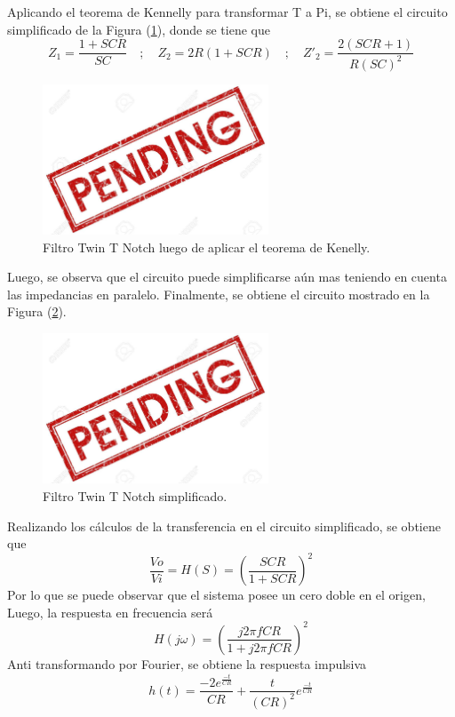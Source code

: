 \documentclass[a4paper]{article}
\begin{document}
Aplicando el teorema de Kennelly para transformar T a Pi, se obtiene el circuito simplificado de la Figura (\ref{fig:filtrosimplificado}), donde se tiene que
\[Z_1=\frac{1+SCR}{SC}\hspace{1em};\hspace{1em} Z_2=2R(1+SCR) \hspace{1em};\hspace{1em} Z'_2=\frac{2(SCR+1)}{R(SC)^2}\]

\begin{figure}[H]
	\centering
	\includegraphics[width=0.6\textwidth]{pend.jpg}
\caption{Filtro Twin T Notch luego de aplicar el teorema de Kenelly.}
	\label{fig:filtrosimplificado}
\end{figure}

Luego, se observa que el circuito puede simplificarse aún mas teniendo en cuenta las impedancias en paralelo. Finalmente, se obtiene el circuito mostrado en la Figura (\ref{fig:filtrofinal}).

\begin{figure}[H]
	\centering
	\includegraphics[width=0.6\textwidth]{pend.jpg}
\caption{Filtro Twin T Notch simplificado.}
	\label{fig:filtrofinal}
\end{figure}

Realizando los cálculos de la transferencia en el circuito simplificado, se obtiene que
\[ \frac{Vo}{Vi}=H(S)=\left( \frac{SCR}{1+SCR} \right)^2 \] 
Por lo que se puede observar que el sistema posee un cero doble en el origen, 
Luego, la respuesta en frecuencia será
\[H(j\omega)=\left( \frac{j 2\pi f CR}{1+ j2\pi f CR} \right)^2 \]
Anti transformando por Fourier, se obtiene la respuesta impulsiva
\[h(t)=\frac{-2e^{\frac{-t}{CR}}}{CR}+\frac{t}{(CR)^2}e^{\frac{-t}{CR}}\]
\end{document}
